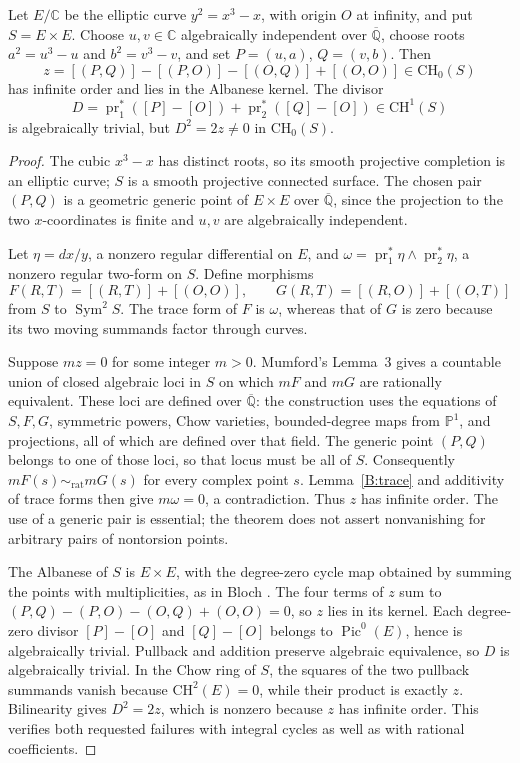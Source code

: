 \begin{theorem}\label{B:square}
Let $E/\mathbb C$ be the elliptic curve $y^2=x^3-x$, with origin $O$ at infinity, and put $S=E\times E$. Choose $u,v\in\mathbb C$ algebraically independent over $\overline{\mathbb Q}$, choose roots $a^2=u^3-u$ and $b^2=v^3-v$, and set $P=(u,a)$, $Q=(v,b)$. Then
\[
 z=[(P,Q)]-[(P,O)]-[(O,Q)]+[(O,O)]\in\mathrm{CH}_0(S)
\]
has infinite order and lies in the Albanese kernel. The divisor
\[
 D=\operatorname{pr}_1^*([P]-[O])+\operatorname{pr}_2^*([Q]-[O])\in\mathrm{CH}^1(S)
\]
is algebraically trivial, but $D^2=2z\ne0$ in $\mathrm{CH}_0(S)$.
\end{theorem}
\begin{proof}
The cubic $x^3-x$ has distinct roots, so its smooth projective completion is an elliptic curve; $S$ is a smooth projective connected surface. The chosen pair $(P,Q)$ is a geometric generic point of $E\times E$ over $\overline{\mathbb Q}$, since the projection to the two $x$-coordinates is finite and $u,v$ are algebraically independent.

Let $\eta=dx/y$, a nonzero regular differential on $E$, and $\omega=\operatorname{pr}_1^*\eta\wedge\operatorname{pr}_2^*\eta$, a nonzero regular two-form on $S$. Define morphisms
\[
 F(R,T)=[(R,T)]+[(O,O)],\qquad
 G(R,T)=[(R,O)]+[(O,T)]
\]
from $S$ to $\operatorname{Sym}^2S$. The trace form of $F$ is $\omega$, whereas that of $G$ is zero because its two moving summands factor through curves.

Suppose $mz=0$ for some integer $m>0$. Mumford's Lemma~3 gives a countable union of closed algebraic loci in $S$ on which $mF$ and $mG$ are rationally equivalent. These loci are defined over $\overline{\mathbb Q}$: the construction uses the equations of $S,F,G$, symmetric powers, Chow varieties, bounded-degree maps from $\mathbb P^1$, and projections, all of which are defined over that field. The generic point $(P,Q)$ belongs to one of those loci, so that locus must be all of $S$. Consequently $mF(s)\sim_{\mathrm{rat}}mG(s)$ for every complex point $s$. Lemma~\ref{B:trace} and additivity of trace forms then give $m\omega=0$, a contradiction. Thus $z$ has infinite order. The use of a generic pair is essential; the theorem does not assert nonvanishing for arbitrary pairs of nontorsion points.

The Albanese of $S$ is $E\times E$, with the degree-zero cycle map obtained by summing the points with multiplicities, as in Bloch \cite[Lecture~1, Proposition (1.1)]{BBloch2010}. The four terms of $z$ sum to $(P,Q)-(P,O)-(O,Q)+(O,O)=0$, so $z$ lies in its kernel. Each degree-zero divisor $[P]-[O]$ and $[Q]-[O]$ belongs to $\operatorname{Pic}^0(E)$, hence is algebraically trivial. Pullback and addition preserve algebraic equivalence, so $D$ is algebraically trivial. In the Chow ring of $S$, the squares of the two pullback summands vanish because $\mathrm{CH}^2(E)=0$, while their product is exactly $z$. Bilinearity gives $D^2=2z$, which is nonzero because $z$ has infinite order. This verifies both requested failures with integral cycles as well as with rational coefficients.
\end{proof}

